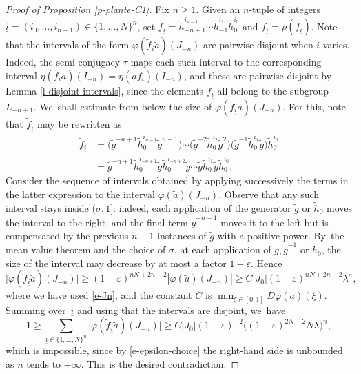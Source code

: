 \documentclass[10pt]{amsart}
\theoremstyle{definition}
\begin{document}
\begin{proof}[Proof of Proposition \ref{p-plante-C1}]
Fix $n\geq 1$. Given an $n$-tuple of integers $\underline{i}=(i_0, \ldots, i_{n-1})\in \{1,\ldots,N\}^n$, set $\widetilde{f}_{\underline{i}}=\widetilde{h}_{-n+1}^{i_{n-1}}\cdots \widetilde{h}_{-1}^{i_1} \widetilde{h}_0^{i_0}$ and ${f}_{\underline{i}}=\rho (\widetilde{f}_{\underline{i}})$. Note that the intervals of the form $\varphi(\widetilde{f}_{\underline{i}}\widetilde{a})(J_{-n})$ are pairwise disjoint when $\underline{i}$ varies. Indeed, the semi-conjugacy $\tau$ maps each such interval to the corresponding interval $\eta(f_{\underline{i}}a)(I_{-n})=\eta(af_{\underline{i}})(I_{-n})$, and these are pairwise disjoint by Lemma \ref{l-disjoint-intervals}, since the elements $f_{\underline{i}}$ all belong to the subgroup $L_{-n+1}$. We~shall estimate from below the size of $\varphi(\widetilde{f}_{\underline{i}}\widetilde{a})(J_{-n})$. For this, note that $\widetilde{f}_{\underline{i}}$ may be rewritten as
\begin{align*}
\widetilde{f}_{\underline{i}}&=\bigl (\widetilde{g}^{-n+1}\widetilde{h}_0^{i_{n-1}}\widetilde{g}^{n-1}\bigr)\cdots\bigl (\widetilde{g}^{-2}\widetilde{h}_0^{i_2}\widetilde{g}^2\bigr)\bigl (\widetilde{g}^{-1}\widetilde{h}_0^{i_1}\widetilde{g}\bigr)\widetilde{h}_0^{i_0}\\
&=\widetilde{g}^{-n+1}\widetilde{h}_0^{i_{-n+1}}\widetilde{g}\widetilde{h}_0^{i_{-n+2}}\widetilde{g}\cdots \widetilde{g}\widetilde{h}_0^{i_1}\widetilde{g}\widetilde{h}_0^{i_0}.
\end{align*}
Consider the sequence of intervals obtained by applying successively the terms in the latter expression to the interval $\varphi(\widetilde{a})(J_{-n})$. Observe that any such interval stays inside $(\sigma, 1]$: indeed, each application of the generator $\widetilde{g}$ or $\widetilde{h}_0$ moves the interval to the right, and the final term $\widetilde{g}^{-n+1}$ moves it to the left but is compensated by the previous $n-1$ instances of $\widetilde{g}$ with a positive power. By~the mean value theorem and the choice of $\sigma$, at each application of $\widetilde{g}, \widetilde{g}^{-1}$ or $\widetilde{h}_0$, the size of the interval may decrease by at most a factor $1-\varepsilon$. Hence
\[\bigl |\varphi(\widetilde{f}_{\underline{i}}\widetilde{a})(J_{-n})\bigr |\geq (1-\varepsilon)^{nN+2n-2}\left |\varphi(\widetilde{a})(J_{-n})\right |\geq C|J_0|(1-\varepsilon)^{nN+2n-2}\lambda^n,
\]
where we have used \eqref{e-Jn}, and the constant $C$ is $\min_{\xi\in[0,1]} D\varphi(\widetilde{a})(\xi)$. Summing over~$\underline{i}$ and using that the intervals are disjoint, we~have
\[1\geq \sum_{\underline{i}\in\{1,\ldots,N\}^n}\bigl |\varphi(\widetilde{f}_{\underline{i}}\widetilde{a})(J_{-n})\bigr |\geq C|J_0| (1-\varepsilon)^{-2} \bigl((1-\varepsilon)^{2N+2}N\lambda\bigr)^n,
\]
which is impossible, since by \eqref{e-epsilon-choice} the right-hand side is unbounded as $n$ tends to $+\infty$. This is the desired contradiction.
\end{proof}
\end{document}
